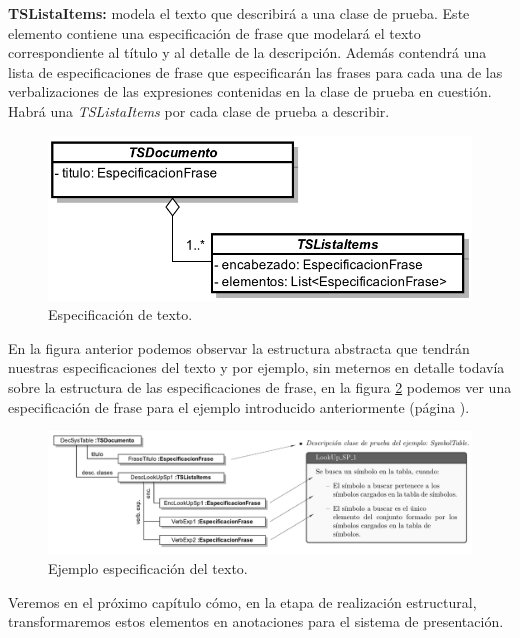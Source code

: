 \medskip
\noindent
\textbf{TSListaItems:} modela el texto que describirá a una clase de prueba. Este elemento contiene una especificación de frase que modelará el texto correspondiente al título y al detalle de la descripción. Además contendrá una lista de especificaciones de frase que especificarán las frases para cada una de las verbalizaciones de las expresiones contenidas en la clase de prueba en cuestión. Habrá una \emph{TSListaItems} por cada clase de prueba a describir.

\begin{figure}[H]
  	\centering
	\includegraphics[scale=0.3]{img/text_spec.png}
	\caption{Especificación de texto.}
  	\label{fig:text_spec}
\end{figure}

En la figura anterior podemos observar la estructura abstracta que tendrán nuestras especificaciones del texto y por ejemplo, sin meternos en detalle todavía sobre la estructura de las especificaciones de frase, en la figura \ref{fig:text_spec_ej} podemos ver una especificación de frase para el ejemplo introducido anteriormente (página \pageref{fig:ej_corpus}).

\begin{figure}[H]
  	\centering
	\includegraphics[scale=0.35]{img/ej_text_spec.png}
	\caption{Ejemplo especificación del texto.}
  \label{fig:text_spec_ej}
\end{figure}

Veremos en el próximo capítulo cómo, en la etapa de realización estructural, transformaremos estos elementos en anotaciones para el sistema de presentación.

